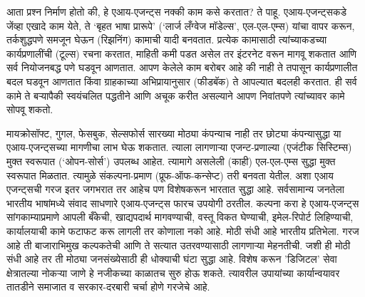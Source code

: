 आता प्रश्न निर्माण होतो की, हे एआय-एजन्ट्स नक्की काम कसे करतात? ते पाहू. एआय-एजन्ट्सकडे जेंव्हा एखादे काम येते, ते `बृहत भाषा प्रारूपे' (`लार्ज लँग्वेज मॉडेल्स', एल-एल-एम्स) यांचा वापर करून, तर्कशुद्धपणे समजून घेऊन (रिझनिंग) कामाची यादी बनवतात. प्रत्येक कामासाठी त्यांच्याकडच्या कार्यप्रणालींची (टूल्स) रचना करतात, माहिती कमी पडत असेल तर इंटरनेट वरून  मागवू शकतात आणि सर्व नियोजनबद्ध पणे घडवून आणतात. आपण केलेले काम बरोबर आहे की नाही ते तपासून कार्यप्रणालीत बदल घडवून आणतात किंवा ग्राहकाच्या अभिप्रायानुसार (फीडबॅक) ते आपल्यात बदलही करतात. ही सर्व कामे ते बऱ्यापैकी स्वयंचलित पद्धतीने आणि अचूक करीत असल्याने आपण निवांतपणे त्यांच्यावर कामे सोपवू शकतो. 

मायक्रोसॉफ्ट, गुगल, फेसबुक, सेल्सफोर्स सारख्या मोठ्या कंपन्याच नाही तर छोट्या कंपन्यासुद्धा या एआय-एजन्ट्सच्या मागणीचा लाभ घेऊ शकतात. त्याला लागणाऱ्या एजन्ट-प्रणाल्या (एजंटीक सिस्टिम्स) मुक्त स्वरूपात (`ओपन-सोर्स') उपलब्ध आहेत. त्यामागे असलेली (काही)  एल-एल-एम्स सुद्धा मुक्त स्वरूपात मिळतात. त्यामुळे संकल्पना-प्रमाण (प्रूफ-ऑफ-कन्सेप्ट) तरी बनवता येतील. अशा एआय एजन्ट्सची गरज इतर जगभरात तर आहेच पण विशेषकरून भारतात सुद्धा आहे. सर्वसामान्य जनतेला भारतीय भाषांमध्ये संवाद साधणारे एआय-एजन्ट्स  फारच उपयोगी ठरतील. कल्पना करा हे एआय-एजन्ट्स सांगकाम्याप्रमाणे आपली बँकेची, खाद्यपदार्थ मागवण्याची, वस्तू विकत घेण्याची, इमेल-रिपोर्ट लिहिण्याची, कार्यालयाची कामे फटाफट करू लागली तर कोणाला नको आहे. मोठी संधी आहे भारतीय प्रतिभेला. गरज आहे ती बाजाराभिमुख कल्पकतेची आणि ते सत्यात उतरवण्यासाठी लागणाऱ्या मेहनतीची. जशी ही मोठी संधी आहे तर ती मोठ्या जनसंख्येसाठी ही धोक्याची घंटा सुद्धा आहे. विशेष करून 'डिजिटल' सेवा क्षेत्रातल्या नोकऱ्या जाणे हे नजीकच्या काळातच सुरु होऊ शकते.  त्यावरील उपायांच्या कार्यान्वयावर तातडीने समाजात व सरकार-दरबारी चर्चा होणे गरजेचे आहे. 